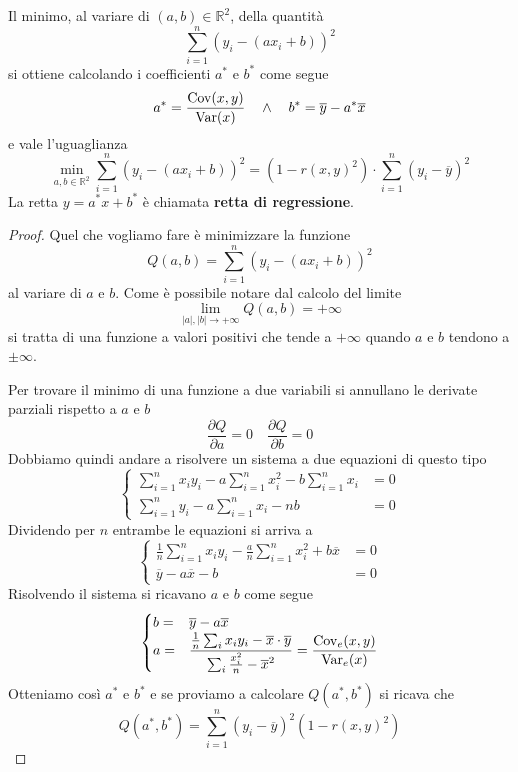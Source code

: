 \begin{theorem}
	Il minimo, al variare di $(a, b) \in \mathbb{R}^2$, della quantità
	\[ \sum_{i=1}^n (y_i - (a x_i + b))^2 \]
	si ottiene calcolando i coefficienti $a^*$ e $b^*$ come segue
	\[ a^* = \frac{\operatorname{Cov}(x, y)}{\operatorname{Var}(x)} \quad \wedge \quad b^* = \overline{y} - a^* \overline{x} \]
	e vale l'uguaglianza
	\[
		\min_{a, b \in \mathbb{R}^2} \sum_{i=1}^n (y_i - (a x_i + b))^2 =
		(1 - r(x, y)^2) \cdot \sum_{i=1}^n (y_i - \overline{y})^2
	\]
	La retta $y = a^* x + b^*$ è chiamata \textbf{retta di regressione}.
	\begin{proof}
		Quel che vogliamo fare è minimizzare la funzione
		\[ Q(a, b) = \sum_{i=1}^n (y_i - (a x_i + b))^2 \]
		al variare di $a$ e $b$. Come è possibile notare dal calcolo del limite
		\[ \lim_{|a|, |b| \to +\infty} Q(a, b) = +\infty \]
		si tratta di una funzione a valori positivi che tende a $+\infty$ quando $a$ e $b$ tendono a
		$\pm\infty$.

		Per trovare il minimo di una funzione a due variabili si annullano le derivate parziali rispetto a
		$a$ e $b$
		\[ \frac{\partial Q}{\partial a} = 0 \quad \frac{\partial Q}{\partial b} = 0 \]
		Dobbiamo quindi andare a risolvere un sistema a due equazioni di questo tipo
		\[
			\begin{cases}
				\sum_{i=1}^n x_i y_i - a \sum_{i=1}^n x_i^2 - b \sum_{i=1}^n x_i & = 0 \\
				\sum_{i=1}^n y_i - a \sum_{i=1}^n x_i - n b                      & = 0
			\end{cases}
		\]
		Dividendo per $n$ entrambe le equazioni si arriva a
		\[
			\begin{cases}
				\frac{1}{n} \sum_{i=1}^n x_i y_i - \frac{a}{n} \sum_{i=1}^n x_i^2 + b \overline{x} & = 0 \\
				\overline{y} - a \overline{x} - b                                                  & = 0
			\end{cases}
		\]
		Risolvendo il sistema si ricavano $a$ e $b$ come segue
		\[
			\begin{cases}
				b = & \overline{y} - a \overline{x}                                                   \\
				a = & \displaystyle\frac{\frac{1}{n}\sum_i x_i y_i - \overline{x} \cdot \overline{y}}
				{\sum_i \frac{x_i^2}{n} - \overline{x}^2} =
				\frac{\operatorname{Cov}_e(x, y)}{\operatorname{Var}_e(x)}
			\end{cases}
		\]
		Otteniamo così $a^*$ e $b^*$ e se proviamo a calcolare $Q(a^*, b^*)$ si ricava che
		\[ Q(a^*, b^*) = \sum_{i=1}^n (y_i - \overline{y})^2 (1 - r(x, y)^2) \]
	\end{proof}
\end{theorem}

